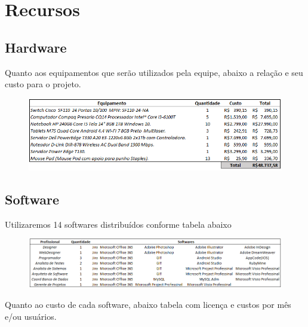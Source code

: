 \chapter[Recursos]{Recursos}

\section[Hardware]{Hardware}

Quanto aos equipamentos que serão utilizados pela equipe, abaixo a relação e seu custo para o projeto.

\begin{figure}[htb]
	\begin{center}
	    \includegraphics[scale=0.7]{figuras/custoHardware}
	\end{center}
\end{figure}

\section[Software]{Software}

Utilizaremos 14 softwares distribuídos conforme tabela abaixo

\begin{figure}[htb]
	\begin{center}
	    \includegraphics[scale=0.7]{figuras/relacaoSoftwares}
	\end{center}
\end{figure}


\newline
Quanto ao custo de cada software, abaixo tabela com licença e custos por mês e/ou usuários.

